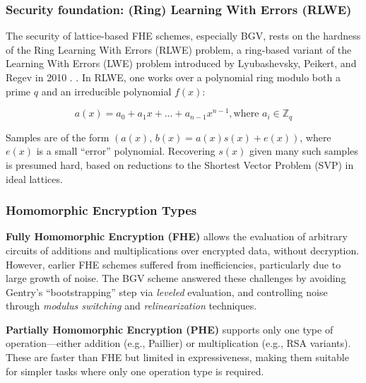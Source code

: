 \subsubsection{Security foundation: (Ring) Learning With Errors (RLWE)} \label{sec:rlwe}

The security of lattice-based FHE schemes, especially BGV, rests on the hardness of the Ring Learning With Errors (RLWE) problem, a ring-based variant of the Learning With Errors (LWE) problem introduced by Lyubashevsky, Peikert, and Regev in 2010 \cite{Lyubashevsky2010-jo}.
. In RLWE, one works over a polynomial ring modulo both a prime $q$ and an irreducible polynomial $f(x)$:

\[
    a(x) = a_0 + a_1 x + \ldots + a_{n-1} x^{n-1}, \text{where } a_i \in \mathbb{Z}_q
\]

Samples are of the form $(a(x),\,b(x)=a(x)s(x)+e(x))$, where $e(x)$ is a small “error” polynomial. Recovering $s(x)$ given many such samples is presumed hard, based on reductions to the Shortest Vector Problem (SVP) in ideal lattices.

\subsubsection{Homomorphic Encryption Types}

\textbf{Fully Homomorphic Encryption (FHE)} allows the evaluation of arbitrary circuits of additions and multiplications over encrypted data, without decryption. However, earlier FHE schemes suffered from inefficiencies, particularly due to large growth of noise. The BGV scheme answered these challenges by avoiding Gentry’s “bootstrapping” \cite{brakerski2011leveled} step via \emph{leveled} evaluation, and controlling noise through \emph{modulus switching} and \emph{relinearization} techniques.

\textbf{Partially Homomorphic Encryption (PHE)} supports only one type of operation—either addition (e.g., Paillier) or multiplication (e.g., RSA variants). These are faster than FHE but limited in expressiveness, making them suitable for simpler tasks where only one operation type is required.

